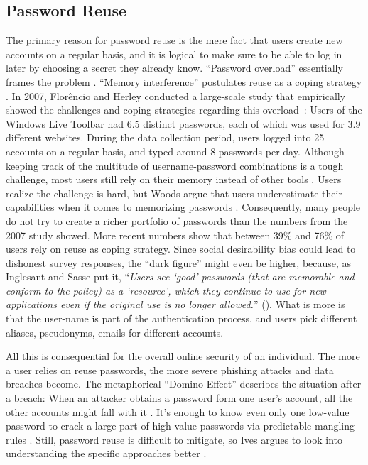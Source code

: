 	\subsection{Password Reuse}
	The primary reason for password reuse is the mere fact that users create new accounts on a regular basis, and it is logical to make sure to be able to log in later by choosing a secret they already know. ``Password overload'' essentially frames the problem \cite{Yang2016MnemonicSentenceBased}. ``Memory interference'' postulates reuse as a coping strategy \cite{Chiasson2009InterferencesGraphical}. In 2007, Florêncio and Herley conducted a large-scale study that empirically showed the challenges and coping strategies regarding this overload \cite{Florencio2007LargeScaleStudyPasswordHabits}: Users of the Windows Live Toolbar had 6.5 distinct passwords, each of which was used for 3.9 different websites. During the data collection period, users logged into 25 accounts on a regular basis, and typed around 8 passwords per day. Although keeping track of the multitude of username-password combinations is a tough challenge, most users still rely on their memory instead of other tools \cite{Olmstead2017AmerciansCybersecurity}. Users realize the challenge is hard, but Woods \etal argue that users underestimate their capabilities when it comes to memorizing passwords \cite{Woods2018TooManyPasswords}. Consequently, many people do not try to create a richer portfolio of passwords than the numbers from the 2007 study showed. More recent numbers show that between 39\% \cite{Olmstead2017AmerciansCybersecurity} and 76\% \cite{CSID2012PasswordHabits} of users rely on reuse as coping strategy. Since social desirability bias could lead to dishonest survey responses, the ``dark figure'' might even be higher, because, as Inglesant and Sasse put it, ``\textit{Users see `good' passwords (that are memorable and conform to the policy) as a `resource', which they continue to use for new applications even if the original use is no longer allowed.}'' (\cite{Inglesant2010TrueCostOfUnusablePolicies}). What is more is that the user-name is part of the authentication process, and users pick different aliases, pseudonyms, emails for different accounts.
	
	All this is consequential for the overall online security of an individual. The more a user relies on reuse passwords, the more severe phishing attacks and data breaches become. The metaphorical ``Domino Effect'' describes the situation after a breach: When an attacker obtains a password form one user's account, all the other accounts might fall with it \cite{Ives2004DominoEffectReuse}. It's enough to know even only one low-value password to crack a large part of high-value passwords via predictable mangling rules \cite{Das2014TangledWeb, Haque2014Hierarchy}. Still, password reuse is difficult to mitigate, so Ives argues to look into understanding the specific approaches better \cite{Ives2004DominoEffectReuse}.
	
